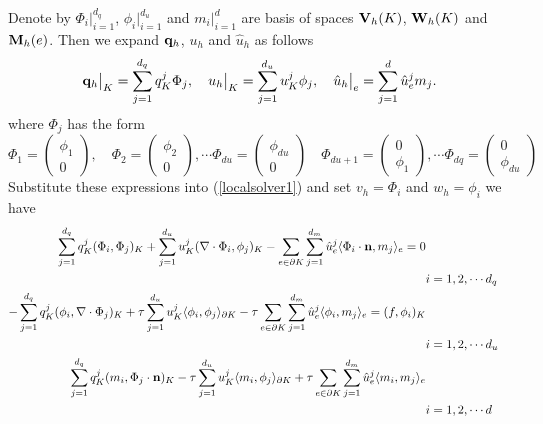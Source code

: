 \documentclass[10pt,reqno, final]{amsart}
\begin{document}
Denote by $\Phi_i\big|_{i=1}^{d_q}$, $\phi_i\big|_{i=1}^{d_u}$ and $m_i\big|_{i=1}^{d}$ are basis of spaces
${\bf V}_h(K)$, ${\bf W}_h(K)$ and ${\bf M}_h(e)$. Then we expand ${\bf q}_h$, $u_h$ and $\hat{u}_h$ as follows
$${\bf q}_h\big|_K=\sum\limits_{j=1}^{d_q}q_K^j\Phi_j,\quad u_h\big|_K=\sum\limits_{j=1}^{d_u}u_K^j\phi_j,\quad \hat{u}_h\big|_e=\sum\limits_{j=1}^{d}\hat{u}_e^jm_j.$$
where $\Phi_j$ has the form
\begin{equation}
\Phi_1=\begin{pmatrix}
\phi_1\\
0
\end{pmatrix},\quad
\Phi_2=\begin{pmatrix}
\phi_2\\
0
\end{pmatrix},\cdots
\Phi_{du}=\begin{pmatrix}
\phi_{du}\\
0
\end{pmatrix}\quad
\Phi_{du+1}=\begin{pmatrix}
0\\
\phi_1
\end{pmatrix},\cdots
\Phi_{dq}=\begin{pmatrix}
0\\
\phi_{du}
\end{pmatrix}
\end{equation}
Substitute these expressions into (\ref{localsolver1}) and set $v_h=\Phi_i$ and $w_h=\phi_i$ we have
\begin{equation}
\begin{split}
\sum\limits_{j=1}^{d_q}q_K^j(\Phi_i, \Phi_j)_K +\sum\limits_{j=1}^{d_u}u_K^j(\nabla\cdot\Phi_i,\phi_j)_K
-\sum\limits_{e\in\partial K}\sum\limits_{j=1}^{d_m}\hat{u}_e^j\langle\Phi_i\cdot{\bf n},m_j\rangle_e =0 \\
&i=1,2,\cdots d_q\nonumber\\
-\sum\limits_{j=1}^{d_q}q_K^j(\phi_i,\nabla\cdot\Phi_j)_K+\tau\sum\limits_{j=1}^{d_u}u_K^j\langle\phi_i,\phi_j\rangle_{\partial K}-\tau\sum\limits_{e\in\partial K}\sum\limits_{j=1}^{d_m}\hat{u}_e^j\langle\phi_i,m_j\rangle_e=(f,\phi_i)_K\\
&i=1,2,\cdots d_u \nonumber\\
\sum\limits_{j=1}^{d_q}q_K^j( m_i,\Phi_j\cdot{\bf n})_K-\tau\sum\limits_{j=1}^{d_u}u_K^j\langle m_i,\phi_j\rangle_{\partial K}
+\tau\sum\limits_{e\in\partial K}\sum\limits_{j=1}^{d_m}\hat{u}_e^j\langle m_i,m_j\rangle_e\\
&i=1,2,\cdots d\\
\end{split}
\end{equation}
\end{document}
